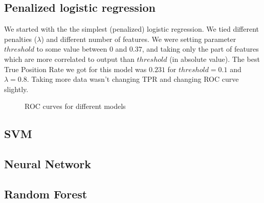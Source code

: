 \documentclass[]{article}
\begin{document}
\subsection{Penalized logistic regression}
We started with the the simplest (penalized) logistic regression. We tied different penalties ($\lambda$) and different number of features. We were setting parameter $threshold$ to some value between $0$ and $0.37$, and taking only the part of features which are more correlated to output than $threshold$ (in absolute value). The best True Position Rate we got for this model was $0.231$ for $threshold = 0.1$ and $\lambda = 0.8$. Taking more data wasn't changing TPR and changing ROC curve slightly.  %

  \begin{figure}[h]
    \center
    \caption{ROC curves for different models}
  \end{figure}

\subsection{SVM}

\subsection{Neural Network}

\subsection{Random Forest}
\end{document}
